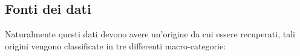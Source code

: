 \subsection{Fonti dei dati}
Naturalmente questi dati devono avere un’origine da cui essere recuperati, tali origini vengono classificate in tre differenti macro-categorie:\cite{upgrad_big_data_sources}

